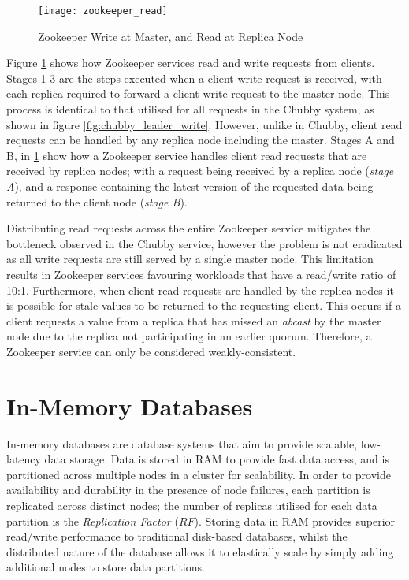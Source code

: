 \begin{figure}[htbp!] 
	    \centering    
	    \texttt{[image: zookeeper\_read]}
	    \caption[Zookeeper Read and Write Requests]{Zookeeper Write at Master, and Read at Replica Node}
	    \label{fig:zookeeper_read}
	\end{figure}	 	
	
    Figure \ref{fig:zookeeper_read} shows how Zookeeper services read and write requests from clients.  Stages 1-3 are the steps executed when a client write request is received, with each replica required to forward a client write request to the master node.  This process is identical to that utilised for all requests in the Chubby system, as shown in figure \ref{fig:chubby_leader_write}.  However, unlike in Chubby, client read requests can be handled by any replica node including the master.  Stages A and B, in \ref{fig:zookeeper_read} show how a Zookeeper service handles client read requests that are received by replica nodes; with a request being received by a replica node (\emph{stage A}), and a response containing the latest version of the requested data being returned to the client node (\emph{stage B}).  

	Distributing read requests across the entire Zookeeper service mitigates the bottleneck observed in the Chubby service, however the problem is not eradicated as all write requests are still served by a single master node.  This limitation results in Zookeeper services favouring workloads that have a read/write ratio of 10:1. Furthermore, when client read requests are handled by the replica nodes it is possible for stale values to be returned to the requesting client.  This occurs if a client requests a value from a replica that has missed an \emph{abcast} by the master node due to the replica not participating in an earlier quorum.  Therefore, a Zookeeper service can only be considered weakly-consistent.   
	
\clearpage
\section{In-Memory Databases}
In-memory databases\citep{Infinispan, Hazelcast, GridGain, OracleCoherence, PivotalGemFire, Schiper:2010:PGP:1915085.1916444} are database systems that aim to provide scalable, low-latency data storage.  Data is stored in RAM to provide fast data access, and is partitioned across multiple nodes in a cluster for scalability.  In order to provide availability and durability in the presence of node failures, each partition is replicated across distinct nodes; the number of replicas utilised for each data partition is the \emph{Replication Factor} ($RF$).  Storing data in RAM provides superior read/write performance to traditional disk-based databases, whilst the distributed nature of the database allows it to elastically scale by simply adding additional nodes to store data partitions.  

